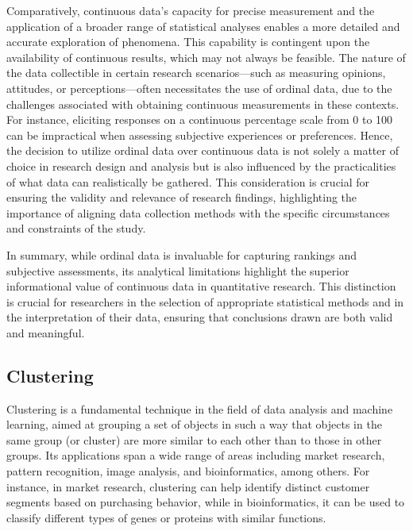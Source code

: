 \documentclass{article}
\begin{document}
Comparatively, continuous data's capacity for precise measurement and the application of a broader range of statistical analyses enables a more detailed and accurate exploration of phenomena. 
This capability is contingent upon the availability of continuous results, which may not always be feasible. The nature of the data collectible in certain research scenarios—such as measuring opinions, attitudes, or perceptions—often necessitates the use of ordinal data, due to the challenges associated with obtaining continuous measurements in these contexts. For instance, eliciting responses on a continuous percentage scale from 0 to 100 can be impractical when assessing subjective experiences or preferences. Hence, the decision to utilize ordinal data over continuous data is not solely a matter of choice in research design and analysis but is also influenced by the practicalities of what data can realistically be gathered. This consideration is crucial for ensuring the validity and relevance of research findings, highlighting the importance of aligning data collection methods with the specific circumstances and constraints of the study.

In summary, while ordinal data is invaluable for capturing rankings and subjective assessments, 
its analytical limitations highlight the superior informational value of continuous data in quantitative research. 
This distinction is crucial for researchers in the selection of appropriate statistical methods and in the interpretation of their data, 
ensuring that conclusions drawn are both valid and meaningful.

\subsection*{Clustering}

Clustering is a fundamental technique in the field of data analysis and machine learning, aimed at grouping a set of objects in such a way that objects in the same group (or cluster) are more similar to each other than to those in other groups. Its applications span a wide range of areas including market research, pattern recognition, image analysis, and bioinformatics, among others. For instance, in market research, clustering can help identify distinct customer segments based on purchasing behavior, while in bioinformatics, it can be used to classify different types of genes or proteins with similar functions.
\end{document}
